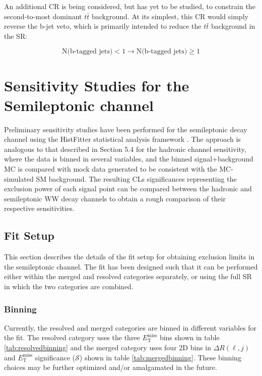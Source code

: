 \documentclass[12pt]{article}
\newcommand*{\met}{\ensuremath{E_\text{T}^\text{miss}} }
\begin{document}
An additional CR is being considered, but has yet to be studied, to constrain the second-to-most dominant $t\bar{t}$ background. At its simplest, this CR would simply reverse the b-jet veto, which is primarily intended to reduce the $t\bar{t}$ background in the SR: 

$$
\text{N(b-tagged jets)} <1 \rightarrow \text{N(b-tagged jets)} \geq1
$$

\section{Sensitivity Studies for the Semileptonic channel}

Preliminary sensitivity studies have been performed for the semileptonic decay channel using the HistFitter statistical analysis framework \cite{Baak:2014wma}. The approach is analogous to that described in Section 5.4 for the hadronic channel sensitivity, where the data is binned in several variables, and the binned signal+background MC is compared with mock data generated to be consistent with the MC-simulated SM background. The resulting CLs significances representing the exclusion power of each signal point can be compared between the hadronic and semileptonic WW decay channels to obtain a rough comparison of their respective sensitivities. 

\subsection{Fit Setup}

This section describes the details of the fit setup for obtaining exclusion limits in the semileptonic channel. The fit has been designed such that it can be performed either within the merged and resolved categories separately, or using the full SR in which the two categories are combined.

\subsubsection{Binning}

Currently, the resolved and merged categories are binned in different variables for the fit. The resolved category uses the three \met bins shown in table \ref{tab:resolvedbinning} and the merged category uses four 2D bins in $\Delta R(\ell, j)$ and \met significance ($\mathcal{S}$) shown in table \ref{tab:mergedbinning}. These binning choices may be further optimized and/or amalgamated in the future. 
\end{document}
